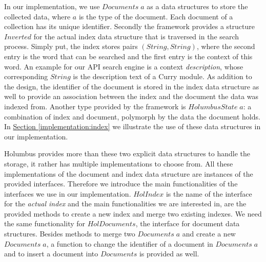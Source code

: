 \documentclass[%
	pdftex,%
	a4paper,%
	oneside,%
	chapterprefix,%
	headsepline,%
	12pt%
]{scrbook}
\newcommand{\Conid}[1]{\mathit{#1}}
\newcommand{\Varid}[1]{\mathit{#1}}
\begin{document}
In our implementation, we use \ensuremath{\Conid{Documents}\;\Varid{a}} as a data structures to
store the collected data, where \ensuremath{\Varid{a}} is the type of the document. %
Each document of a collection has its unique identifier. %
Secondly the framework provides a structure \ensuremath{\Conid{Inverted}} for the actual
index data structure that is traversed in the search process. %
Simply put, the index stores pairs \ensuremath{(\Conid{String},\Conid{String})}, where the
second entry is the word that can be searched and the first entry is
the context of this word. %
An example for our API search engine is a context \emph{description},
whose corresponding \ensuremath{\Conid{String}} is the description text of a Curry
module. %
As addition to the design, the identifier of the document is stored in
the index data structure as well to provide an association between the
index and the document the data was indexed from. %
Another type provided by the framework is \ensuremath{\Conid{HolumbusState}\;\Varid{a}}: a
combination of index and document, polymorph by the data the document
holds. %
In \hyperref[implementation:index]{Section \ref{implementation:index}}
we illustrate the use of these data structures in our
implementation.

Holumbus provides more than these two explicit data structures to
handle the storage, it rather has multiple implementations to choose
from. %
All these implementations of the document and index data structure are
instances of the provided interfaces. %
Therefore we introduce the main functionalities of the interfaces we
use in our implementation. %
\ensuremath{\Conid{HolIndex}} is the name of the interface for the \emph{actual index}
and the main functionalities we are interested in, are the provided
methods to create a new index and merge two existing indexes. %
We need the same functionality for \ensuremath{\Conid{HolDocuments}}, the interface for
document data structures. %
Besides methods to merge two \ensuremath{\Conid{Documents}\;\Varid{a}} and create a new \ensuremath{\Conid{Documents}\;\Varid{a}}, a function to change the identifier of a document in \ensuremath{\Conid{Documents}\;\Varid{a}}
and to insert a document into \ensuremath{\Conid{Documents}} is provided as well.\\
\end{document}
